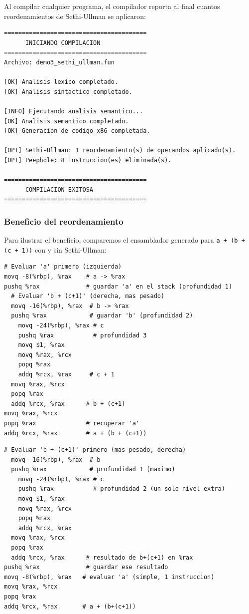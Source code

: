 \documentclass[12pt, a4paper]{article}
\begin{document}
Al compilar cualquier programa, el compilador reporta al final cuantos reordenamientos de Sethi-Ullman se aplicaron:

\begin{lstlisting}[style=grammarstyle, caption={Salida del compilador con las optimizaciones activas}]
========================================
      INICIANDO COMPILACION
========================================
Archivo: demo3_sethi_ullman.fun

[OK] Analisis lexico completado.
[OK] Analisis sintactico completado.

[INFO] Ejecutando analisis semantico...
[OK] Analisis semantico completado.
[OK] Generacion de codigo x86 completada.

[OPT] Sethi-Ullman: 1 reordenamiento(s) de operandos aplicado(s).
[OPT] Peephole: 8 instruccion(es) eliminada(s).

========================================
      COMPILACION EXITOSA
========================================
\end{lstlisting}

\subsubsection{Beneficio del reordenamiento}

Para ilustrar el beneficio, comparemos el ensamblador generado para \texttt{a + (b + (c + 1))} con y sin Sethi-Ullman:

\begin{lstlisting}[style=asmstyle, caption={Sin Sethi-Ullman: evaluar izquierda primero}]
# Evaluar 'a' primero (izquierda)
movq -8(%rbp), %rax    # a -> %rax
pushq %rax             # guardar 'a' en el stack (profundidad 1)
  # Evaluar 'b + (c+1)' (derecha, mas pesado)
  movq -16(%rbp), %rax  # b -> %rax
  pushq %rax            # guardar 'b' (profundidad 2)
    movq -24(%rbp), %rax # c
    pushq %rax           # profundidad 3
    movq $1, %rax
    movq %rax, %rcx
    popq %rax
    addq %rcx, %rax     # c + 1
  movq %rax, %rcx
  popq %rax
  addq %rcx, %rax      # b + (c+1)
movq %rax, %rcx
popq %rax              # recuperar 'a'
addq %rcx, %rax        # a + (b + (c+1))
\end{lstlisting}

\begin{lstlisting}[style=asmstyle, caption={Con Sethi-Ullman: evaluar derecha primero (mas pesada)}]
# Evaluar 'b + (c+1)' primero (mas pesado, derecha)
  movq -16(%rbp), %rax  # b
  pushq %rax            # profundidad 1 (maximo)
    movq -24(%rbp), %rax # c
    pushq %rax           # profundidad 2 (un solo nivel extra)
    movq $1, %rax
    movq %rax, %rcx
    popq %rax
    addq %rcx, %rax
  movq %rax, %rcx
  popq %rax
  addq %rcx, %rax      # resultado de b+(c+1) en %rax
pushq %rax             # guardar ese resultado
movq -8(%rbp), %rax   # evaluar 'a' (simple, 1 instruccion)
movq %rax, %rcx
popq %rax
addq %rcx, %rax       # a + (b+(c+1))
\end{lstlisting}
\end{document}
